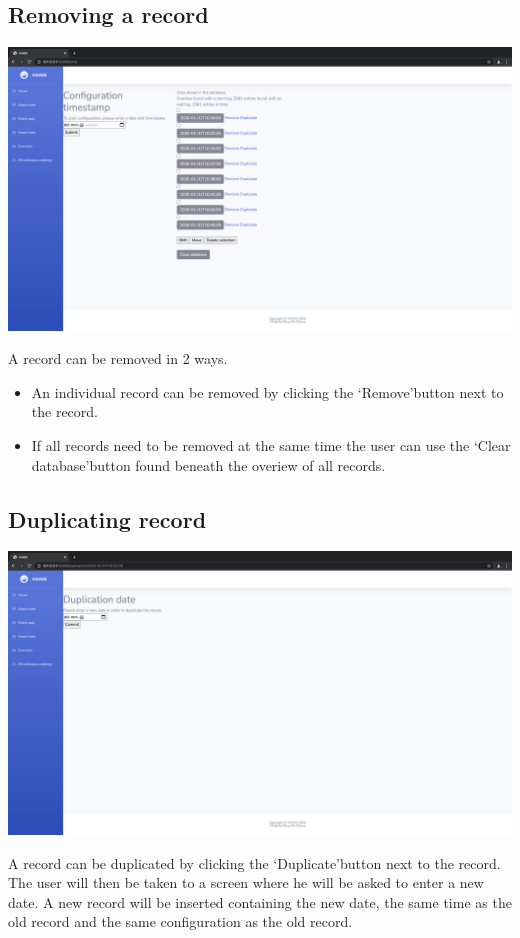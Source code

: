 \documentclass[12pt]{article}
\begin{document}
\subsection{Removing a record}
\begin{center}
	\includegraphics[width=\linewidth]{images/Removing_records.png}
\end{center}
A record can be removed in 2 ways.
\begin{itemize}
	\item An individual record can be removed by clicking the \lq Remove\rq button next to the record.
	\item If all records need to be removed at the same time the user can use the \lq Clear database\rq button found beneath the overiew of all records.
\end{itemize}

\subsection{Duplicating record}
\begin{center}
	\includegraphics[width=\linewidth]{images/Duplicate_records.png}
\end{center}
A record can be duplicated by clicking the \lq Duplicate\rq  button next to the record.\\
The user will then be taken to a screen where he will be asked to enter a new date. A new record will be inserted containing the new date, the same time as the old record and the same configuration as the old record.
\end{document}
